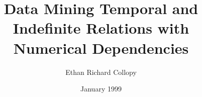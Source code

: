 \def \cover{-\!\!\!<}
\def \weak{\mid\!\approx}
\def \notweak{\mid\!\not\approx}
\def \mm{\mathcal{M}}
\def \half{\frac{1}{2}}
\def \temp{\to_{\otimes}}
\def \time{\Longrightarrow}
\def \live{\Diamond \Box}
\def \a{\wedge}
\def \eqto{\Longleftrightarrow}
\def \up{\uparrow}
\def \down{\downarrow}
\def \last{\protect{\stackrel{-\!\!-}{\bigcirc}}}
\def \next{\protect{\bigcirc}}
\def \diamond{\protect{\Diamond\!\!\!\!-}}
\def \diam{\protect{\mbox{\raisebox{-0.0353cm}{$\Diamond$}$\!\!\!\!\:\!\!-$}}}
\def \dimo{\protect{\raisebox{-0.0353cm}{$\Diamond$}$\!\!\!\!\:\!\!-$}}
\def \past{\protect{\stackrel{-\!\!-}{\Diamond}}}
\def \allpast{\protect{\stackrel{-\!\!-}{\Box}}}
\def \some{\protect{\Diamond^*}}
\def \all{\protect{\Box^*}}
\def \Tri{\bigtriangledown}
\def \bm{\boxminus}
\def \ttb{\begin{ttfamily}}
\def \tte{\end{ttfamily}}
\def \techrep{\cite{cl98}}
\def \na{\newcounter{alg}\setcounter{alg}{1}\arabic{alg}}
\def \ra{\setcounter{alg}{1}\arabic{alg}}
\def \sa{\stepcounter{alg}\arabic{alg}}
\def \line{\renewcommand{\baselinestretch}{1}}
\newcommand{\resp}[2]{$\bm^{#1}$\diam$^{#2}$}
\newcommand{\pers}[2]{\diam$^{#1}$$\bm^{#2}$}
\newcommand{\series}[1]{$y_1, y_2, \ldots, y_{#1}$}
\newcommand{\safe}[1]{$\bm^{#1}$}
\newcommand{\guar}[1]{\diam$^{#1}$}

\documentclass[11pt,oneside]{erc_ucl_thesis}
\usepackage[dvips]{graphics}
\usepackage{latexsym,erc_ucl,makeidx,amssymb,apalike}

\makeindex

\title{Data Mining Temporal and Indefinite Relations with Numerical Dependencies} 

\author{
Ethan Richard Collopy
}

\date{January 1999}  

\newcommand{\avec}[1]{\ensuremath{#1_1, \ldots, #1_n}}
\newcommand{\angavec}[1]{\ensuremath{\langle #1_1, \ldots, #1_n \rangle}}



         


\maketitle 
%


